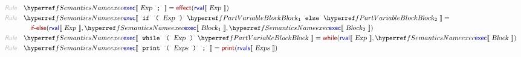 \begin{align*}
\\
  \KEY{Rule} \quad
    & \SEMREF{exec} \LEFTPHRASE \
                            \VARHYPER{../.}{SIMPLE-2-Expressions}{Exp} \ \LEX{{;}} \
                          \RIGHTPHRASE  = 
      \NAMEHYPER{../../../../../Funcons-beta/Computations/Normal}{Flowing}{effect}
        (  \SEMHYPER{../.}{SIMPLE-2-Expressions}{rval} \LEFTPHRASE \
                                    \VAR{Exp} \
                                  \RIGHTPHRASE  )
\\
  \KEY{Rule} \quad
    & \SEMREF{exec} \LEFTPHRASE \
                            \LEX{if} \ \LEX{{(}} \ \VARHYPER{../.}{SIMPLE-2-Expressions}{Exp} \ \LEX{{)}} \ \VARREF{Block}\SUB{1} \ \LEX{else} \ \VARREF{Block}\SUB{2} \
                          \RIGHTPHRASE  = \\&\quad
      \NAMEHYPER{../../../../../Funcons-beta/Computations/Normal}{Flowing}{if-else}
        (  \SEMHYPER{../.}{SIMPLE-2-Expressions}{rval} \LEFTPHRASE \
                                    \VAR{Exp} \
                                  \RIGHTPHRASE , 
               \SEMREF{exec} \LEFTPHRASE \
                                    \VAR{Block}\SUB{1} \
                                  \RIGHTPHRASE , 
               \SEMREF{exec} \LEFTPHRASE \
                                    \VAR{Block}\SUB{2} \
                                  \RIGHTPHRASE  )
\\
  \KEY{Rule} \quad
    & \SEMREF{exec} \LEFTPHRASE \
                            \LEX{while} \ \LEX{{(}} \ \VARHYPER{../.}{SIMPLE-2-Expressions}{Exp} \ \LEX{{)}} \ \VARREF{Block} \
                          \RIGHTPHRASE  = 
      \NAMEHYPER{../../../../../Funcons-beta/Computations/Normal}{Flowing}{while}
        (  \SEMHYPER{../.}{SIMPLE-2-Expressions}{rval} \LEFTPHRASE \
                                    \VAR{Exp} \
                                  \RIGHTPHRASE , 
               \SEMREF{exec} \LEFTPHRASE \
                                    \VAR{Block} \
                                  \RIGHTPHRASE  )
\\
  \KEY{Rule} \quad
    & \SEMREF{exec} \LEFTPHRASE \
                            \LEX{print} \ \LEX{{(}} \ \VARHYPER{../.}{SIMPLE-2-Expressions}{Exps} \ \LEX{{)}} \ \LEX{{;}} \
                          \RIGHTPHRASE  = 
      \NAMEHYPER{../../../../../Funcons-beta/Computations/Normal}{Interacting}{print}
        (  \SEMHYPER{../.}{SIMPLE-2-Expressions}{rvals} \LEFTPHRASE \
                                    \VAR{Exps} \
                                  \RIGHTPHRASE  )
\\

\end{align*}
